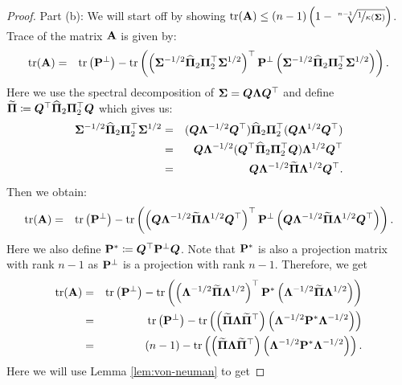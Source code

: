 \documentclass[numsec,webpdf,modern,medium,namedate]{oup-authoring-template}
\theoremstyle{thmstyleone}%
\theoremstyle{thmstyletwo}%
\theoremstyle{thmstylethree}%
\begin{document}
\begin{proof}
{Part (b):} We will start off by showing $\tr(\bA) \leq (n - 1) \left( 1 - \sqrt[n-1]{ \nicefrac{1}{\kappa \left( {\bSig} \right)}} \right)$. Trace of the matrix $\bA$ is given by:
    \begin{eqnarray*}
        \tr(\bA) & = & \tr \left(\bP^\perp \right) - \tr \left( \left({\bSig}^{-1/2} \hatPi_2 {\bPi}_2^\top {\bSig}^{1/2} \right)^\top \bP^\perp \left({\bSig}^{-1/2} \hatPi_2 {\bPi}_2^\top {\bSig}^{1/2} \right) \right).
    \end{eqnarray*}
    Here we use the spectral decomposition of ${\bSig} = \bQ \bLam \bQ^\top$ and define $\widetilde{{\bPi}} \coloneq \bQ^\top\hatPi_2 {\bPi}_2^\top \bQ$ which gives us: 
    \begin{eqnarray*}
       {\bSig}^{-1/2} \hatPi_2 {\bPi}_2^\top {\bSig}^{1/2} & = & (\bQ \bLam^{-1/2} \bQ^\top) \hatPi_2 {\bPi}_2^\top (\bQ \bLam^{1/2} \bQ^\top)\\
       & = & \bQ \bLam^{-1/2} (\bQ^\top \hatPi_2 {\bPi}_2^\top \bQ) \bLam^{1/2} \bQ^\top\\
       & = & \bQ\bLam^{-1/2} \widetilde{{\bPi}}\bLam^{1/2} \bQ^\top.
    \end{eqnarray*}
    Then we obtain:
    \begin{eqnarray*}
        \tr(\bA) & = & \tr \left(\bP^\perp \right) - \tr \left( \left( \bQ \bLam^{-1/2} \widetilde{{\bPi}} \bLam^{1/2} \bQ^\top \right)^\top \bP^\perp \left( \bQ \bLam^{-1/2} \widetilde{{\bPi}} \bLam^{1/2} \bQ^\top \right)\right).
    \end{eqnarray*}
    Here we also define $\bP^\ast \coloneqq \bQ^\top \bP^\perp \bQ$. Note that $\bP^\ast$ is also a projection matrix with rank $n-1$ as $\bP^\perp$ is a projection with rank $n-1$. Therefore, we get
    \begin{eqnarray}
        \tr(\bA) & = & \tr \left(\bP^\perp \right) - \tr \left( \left( \bLam^{-1/2} \widetilde{{\bPi}} \bLam^{1/2} \right)^\top \bP^\ast \left( \bLam^{-1/2} \widetilde{{\bPi}} \bLam^{1/2} \right)\right) \notag \\
        & = & \tr \left(\bP^\perp \right) - \tr \left( \left( \widetilde{{\bPi}} \bLam \widetilde{{\bPi}}^\top \right) \left( \bLam^{-1/2} \bP^\ast \bLam^{-1/2} \right) \right) \notag \\
        & = & (n - 1) - \tr \left( \left( \widetilde{{\bPi}} \bLam \widetilde{{\bPi}}^\top \right) \left( \bLam^{-1/2} \bP^\ast \bLam^{-1/2} \right) \right). \label{eq:upper_trA_eq1}
    \end{eqnarray}
    Here we will use Lemma \ref{lem:von-neuman} to get 

\end{proof}
\end{document}
